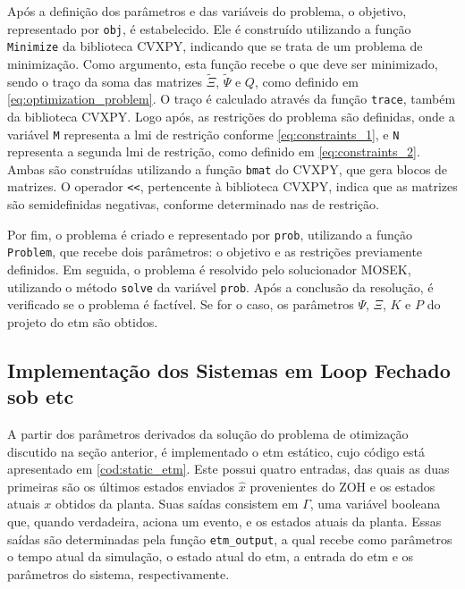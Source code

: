 Após a definição dos parâmetros e das variáveis do problema, o objetivo, representado por \texttt{obj}, é estabelecido. Ele é construído utilizando a função \texttt{Minimize} da biblioteca CVXPY, indicando que se trata de um problema de minimização. Como argumento, esta função recebe o que deve ser minimizado, sendo o traço da soma das matrizes $\tilde{\Xi}$, $\tilde{\Psi}$ e $Q$, como definido em \eqref{eq:optimization_problem}. O traço é calculado através da função \texttt{trace}, também da biblioteca CVXPY. Logo após, as restrições do problema são definidas, onde a variável \texttt{M} representa a \acrshort{lmi} de restrição conforme \eqref{eq:constraints_1}, e \texttt{N} representa a segunda \acrshort{lmi} de restrição, como definido em \eqref{eq:constraints_2}. Ambas são construídas utilizando a função \texttt{bmat} do CVXPY, que gera blocos de matrizes. O operador \texttt{<<}, pertencente à biblioteca CVXPY, indica que as matrizes são semidefinidas negativas, conforme determinado nas  de restrição.

Por fim, o problema é criado e representado por \texttt{prob}, utilizando a função \texttt{Problem}, que recebe dois parâmetros: o objetivo e as restrições previamente definidos. Em seguida, o problema é resolvido pelo solucionador MOSEK, utilizando o método \texttt{solve} da variável \texttt{prob}. Após a conclusão da resolução, é verificado se o problema é factível. Se for o caso, os parâmetros $\Psi$, $\Xi$, $K$ e $P$ do projeto do \acrshort{etm} são obtidos.

\subsection{Implementação dos Sistemas em Loop Fechado sob \acrshort{etc}}


A partir dos parâmetros derivados da solução do problema de otimização discutido na seção anterior, é implementado o \acrshort{etm} estático, cujo código está apresentado em \ref{cod:static_etm}. Este possui quatro entradas, das quais as duas primeiras são os últimos estados enviados $\hat{x}$ provenientes do ZOH e os estados atuais $x$ obtidos da planta. Suas saídas consistem em $\Gamma$, uma variável booleana que, quando verdadeira, aciona um evento, e os estados atuais da planta. Essas saídas são determinadas pela função \texttt{etm\_output}, a qual recebe como parâmetros o tempo atual da simulação, o estado atual do \acrshort{etm}, a entrada do \acrshort{etm} e os parâmetros do sistema, respectivamente.

